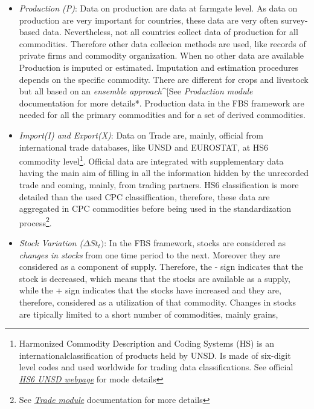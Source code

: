 \documentclass[]{article}
\let\rmarkdownfootnote\footnote%
\def\footnote{\protect\rmarkdownfootnote}
\begin{document}
\begin{itemize}
\item
  \emph{Production (P)}: Data on production are data at farmgate level.
  As data on production are very important for countries, these data are
  very often survey-based data. Nevertheless, not all countries collect
  data of production for all commodities. Therefore other data collecion
  methods are used, like records of private firms and commodity
  organization. When no other data are available Production is imputed
  or estimated. Imputation and estimation procedures depends on the
  specific commodity. There are different for crops and livestock but
  all based on an \emph{ensemble approach}\^{}{[}See \emph{Production
  module} documentation for more details*. Production data in the FBS
  framework are needed for all the primary commodities and for a set of
  derived commodities.
\item
  \emph{Import(I) and Export(X)}: Data on Trade are, mainly, official
  from international trade databases, like UNSD and EUROSTAT, at HS6
  commodity level\footnote{Harmonized Commodity Description and Coding
    Systems (HS) is an internationalclassification of products held by
    UNSD. Is made of six-digit level codes and used worldwide for
    trading data classifications. See official
    \href{https://unstats.un.org/unsd/tradekb/Knowledgebase/50018/Harmonized-Commodity-Description-and-Coding-Systems-HS}{\emph{HS6
    UNSD webpage}} for mode details}. Official data are integrated with
  supplementary data having the main aim of filling in all the
  information hidden by the unrecorded trade and coming, mainly, from
  trading partners. HS6 classification is more detailed than the used
  CPC classiffication, therefore, these data are aggregated in CPC
  commodities before being used in the standardization process\footnote{See
    \href{https://github.com/SWS-Methodology/faoswsTrade/blob/master/vignettes/Documentation/tradeDocumentation.pdf}{\emph{Trade
    module}} documentation for more details}.
\item
  \emph{Stock Variation (}\(\Delta St_{t})\): In the FBS framework,
  stocks are considered as \emph{changes in stocks} from one time period
  to the next. Moreover they are considered as a component of supply.
  Therefore, the - sign indicates that the stock is decreased, which
  means that the stocks are available as a supply, while the + sign
  indicates that the stocks have increased and they are, therefore,
  considered as a utilization of that commodity. Changes in stocks are
  tipically limited to a short number of commodities, mainly grains,

\end{itemize}
\end{document}
